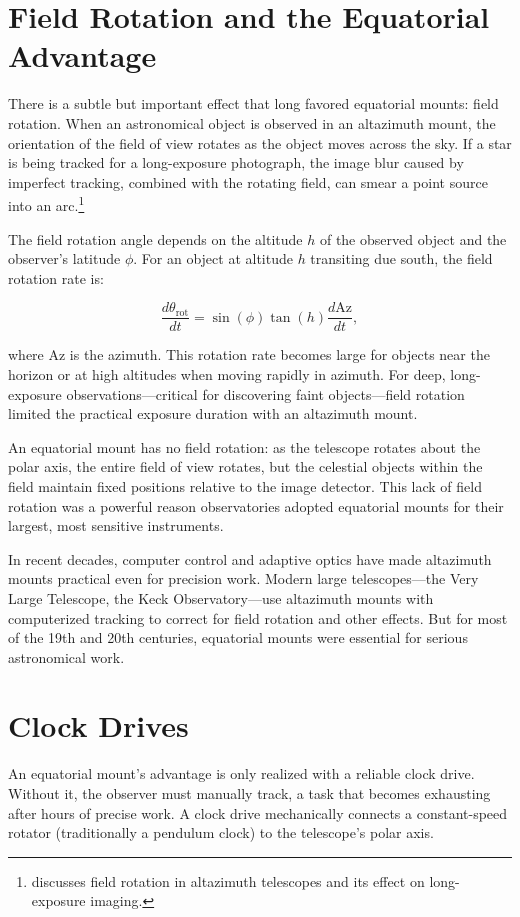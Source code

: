 \section{Field Rotation and the Equatorial Advantage}

There is a subtle but important effect that long favored equatorial mounts: field rotation. When an astronomical object is observed in an altazimuth mount, the orientation of the field of view rotates as the object moves across the sky. If a star is being tracked for a long-exposure photograph, the image blur caused by imperfect tracking, combined with the rotating field, can smear a point source into an arc.\footnote{\textcite{Malin1979} discusses field rotation in altazimuth telescopes and its effect on long-exposure imaging.}

The field rotation angle depends on the altitude $h$ of the observed object and the observer's latitude $\phi$. For an object at altitude $h$ transiting due south, the field rotation rate is:

\[
  \frac{d\theta_{\text{rot}}}{dt} = \sin(\phi) \tan(h) \frac{d\text{Az}}{dt},
\]

where Az is the azimuth. This rotation rate becomes large for objects near the horizon or at high altitudes when moving rapidly in azimuth. For deep, long-exposure observations—critical for discovering faint objects—field rotation limited the practical exposure duration with an altazimuth mount.

An equatorial mount has no field rotation: as the telescope rotates about the polar axis, the entire field of view rotates, but the celestial objects within the field maintain fixed positions relative to the image detector. This lack of field rotation was a powerful reason observatories adopted equatorial mounts for their largest, most sensitive instruments.

In recent decades, computer control and adaptive optics have made altazimuth mounts practical even for precision work. Modern large telescopes—the Very Large Telescope, the Keck Observatory—use altazimuth mounts with computerized tracking to correct for field rotation and other effects. But for most of the 19th and 20th centuries, equatorial mounts were essential for serious astronomical work.

\section{Clock Drives}

An equatorial mount's advantage is only realized with a reliable clock drive. Without it, the observer must manually track, a task that becomes exhausting after hours of precise work. A clock drive mechanically connects a constant-speed rotator (traditionally a pendulum clock) to the telescope's polar axis.

